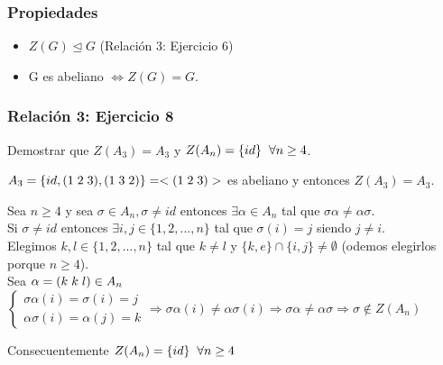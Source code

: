 \documentclass[11pt,a4paper]{article}
\begin{document}
\subsubsection*{Propiedades}

\begin{itemize}
\item $Z(G) \unlhd G$ (Relación 3: Ejercicio 6)
\item G es abeliano $\iff Z(G) = G$.
\end{itemize}

\subsubsection*{Relación 3: Ejercicio 8}

Demostrar que $Z(A_{3}) = A_{3}$ y $Z(A_{n}) = \{id\} \hspace{0.2cm} \forall n \geq 4$.

$A_{3} = \{id, (1 \hspace{0.1cm} 2 \hspace{0.1cm} 3), (1 \hspace{0.1cm} 3 \hspace{0.1cm} 2)\} = <(1 \hspace{0.1cm} 2 \hspace{0.1cm} 3)>$ es abeliano y entonces $Z(A_{3}) = A_{3}$.

Sea $n \geq 4$ y  sea $\sigma \in A_{n}, \sigma \neq id$ entonces $\exists \alpha \in A_{n}$ tal que $\sigma\alpha \neq \alpha\sigma$. \\
Si $\sigma \neq id$ entonces $\exists i, j \in \{1, 2, ..., n\}$ tal que $\sigma(i) = j$ siendo $j \neq i$. \\
Elegimos $k, l \in \{1, 2, ..., n\}$ tal que $k \neq l$ y $\{k, e\} \cap \{i, j\} \neq \emptyset$ (odemos elegirlos porque $n \geq 4$). \\
Sea $\alpha = (k \hspace{0.1cm} k \hspace{0.1cm} l) \in A_{n}$ \\
$\begin{cases}
\sigma \alpha (i) = \sigma(i) = j \\
\alpha \sigma (i) = \alpha(j) = k
\end{cases}
\Rightarrow \sigma \alpha (i) \neq \alpha \sigma (i) \Rightarrow \sigma \alpha \neq \alpha \sigma \Rightarrow \sigma \notin Z(A_{n})$

Consecuentemente $Z(A_{n}) = \{id\} \hspace{0.2cm} \forall n \geq 4$
\end{document}
